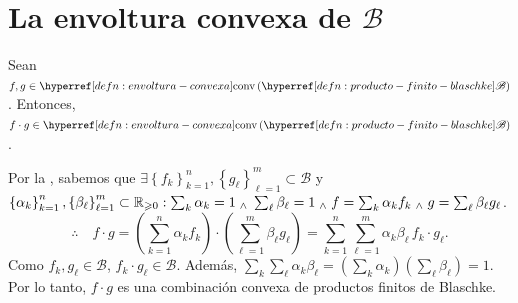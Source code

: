 \section{La envoltura convexa de $\mathscr{B}$}

\begin{lem}\label{lem:prod-combinacion-convexa-prod-finito-blaschke}
    Sean $f, g \in \exhyperref[defn:envoltura-convexa]{envoltura-convexa}{\operatorname{conv}} \left(\exhyperref[defn:producto-finito-blaschke]{producto-finito-blaschke}{\mathscr{B}}\right)$. Entonces, $f \cdot g \in \exhyperref[defn:envoltura-convexa]{envoltura-convexa}{\operatorname{conv}} \left(\exhyperref[defn:producto-finito-blaschke]{producto-finito-blaschke}{\mathscr{B}}\right)$.
\end{lem}
\begin{dem}
    Por la , sabemos que $\exists \left\{f_k\right\}_{k=1}^n, \left\{g_\ell\right\}_{\ell=1}^m \subset \mathscr{B}$ y $\left\{\alpha_k\right\}_{k=1}^n, \left\{\beta_\ell\right\}_{\ell=1}^m \subset \mathbb{R}_{\geqslant 0} : \sum_{k} \alpha_k = 1 \; _{\wedge} \; \sum_{\ell} \beta_\ell = 1 \; _{\wedge} \; f = \sum_{k} \alpha_k f_k \; _{\wedge} \; g = \sum_{\ell} \beta_\ell g_\ell$.
    \[
    \therefore \quad f \cdot g = \left( \sum_{k=1}^n \alpha_k f_k \right) \cdot \left( \sum_{\ell=1}^m \beta_\ell g_\ell \right) = \sum_{k=1}^n \sum_{\ell=1}^m \alpha_k \beta_\ell \, f_k \cdot g_\ell.
    \]
    Como $f_k, g_\ell \in \mathscr{B}$, $f_k \cdot g_\ell \in \mathscr{B}$. Además, $\sum_{k} \sum_{\ell} \alpha_k \beta_\ell = \left( \sum_{k} \alpha_k \right) \left( \sum_{\ell} \beta_\ell \right) = 1$. Por lo tanto, $f \cdot g$ es una combinación convexa de productos finitos de Blaschke.\hfill\qedsymbol
\end{dem}

